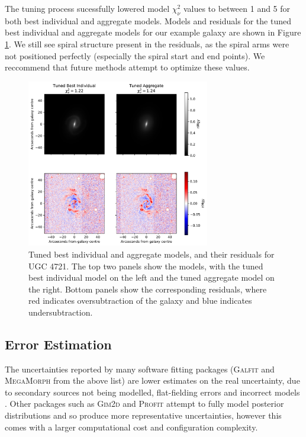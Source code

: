 \documentclass[../main.tex]{subfiles}
\begin{document}
The tuning process sucessfully lowered model $\chi_\nu^2$ values to between 1 and 5 for both best individual and aggregate models. Models and residuals for the tuned best individual and aggregate models for our example galaxy are shown in Figure \ref{fig:bi_vs_agg_comparison}. We still see spiral structure present in the residuals, as the spiral arms were not positioned perfectly (especially the spiral start and end points). We reccommend that future methods attempt to optimize these values.

\begin{figure}
  \includegraphics[width=8cm]{images__method/bi_vs_agg_comparison.pdf}
  \caption{Tuned best individual and aggregate models, and their residuals for UGC 4721. The top two panels show the models, with the tuned best individual model on the left and the tuned aggregate model on the right. Bottom panels show the corresponding residuals, where red indicates oversubtraction of the galaxy and blue indicates undersubtraction.}
  \label{fig:bi_vs_agg_comparison}
\end{figure}


\subsection{Error Estimation}
\label{sec:error_estimation}

The uncertainties reported by many software fitting packages (\textsc{Galfit} and \textsc{MegaMorph} from the above list) are lower estimates on the real uncertainty, due to secondary sources not being modelled, flat-fielding errors and incorrect models \citep{2010AJ....139.2097P}. Other packages such as \textsc{Gim2d} and \textsc{Profit} attempt to fully model posterior distributions and so produce more representative uncertainties, however this comes with a larger computational cost and configuration complexity.
\end{document}
